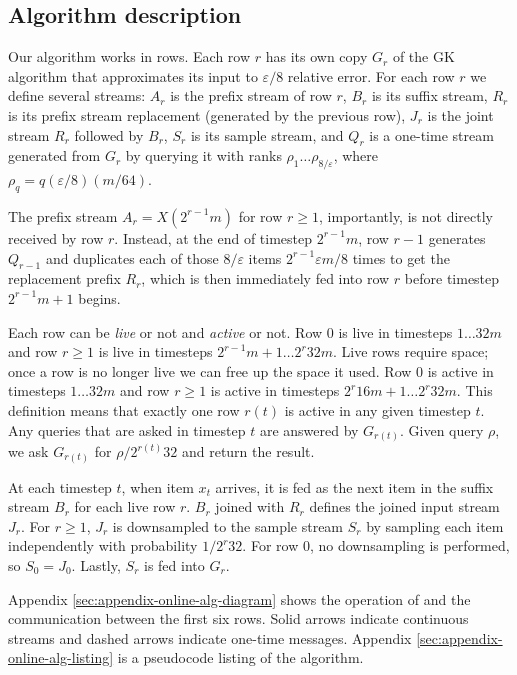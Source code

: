 \documentclass{article}
\theoremstyle{plain}
\def\ep{\varepsilon}
\def\m{\!-\!}
\def\pl{\!+\!}
\newcommand{\p}[1]{(#1)}
\begin{document}
\subsection{Algorithm description}
\label{sec:online-alg}

Our algorithm works in rows. Each row $r$ has its own copy $G_r$ of the GK
algorithm that approximates its input to $\ep/8$ relative error. For each row
$r$ we define several streams: $A_r$ is the prefix stream of row $r$, $B_r$ is
its suffix stream, $R_r$ is its prefix stream replacement (generated by the
previous row), $J_r$ is the joint stream $R_r$ followed by $B_r$, $S_r$ is its
sample stream, and $Q_r$ is a one-time stream generated from $G_r$ by querying
it with ranks
$\rho_1 \ldots \rho_{8/\ep}$,
where $\rho_q = q \p{\ep/8} \p{m/64}$.

The prefix stream $A_r = X\p{2^{r-1} m}$ for row $r \ge 1$, importantly, is not
directly received by row $r$. Instead, at the end of timestep $2^{r-1} m$, row
$r \m 1$ generates $Q_{r-1}$ and duplicates each of those $8 / \ep$ items
$2^{r-1} \ep m / 8$ times to get the replacement prefix $R_r$, which is then
immediately fed into row $r$ before timestep $2^{r-1} m \pl 1$ begins.

Each row can be \emph{live} or not and \emph{active} or not. Row $0$ is live in
timesteps $1 \ldots 32 m$ and row $r \ge 1$ is live in timesteps $2^{r-1} m \pl
1 \ldots 2^r 32 m$. Live rows require space; once a row is no longer live we can
free up the space it used. Row $0$ is active in timesteps $1 \ldots 32 m$ and
row $r \ge 1$ is active in timesteps $2^r 16 m \pl 1 \ldots 2^r 32 m$. This
definition means that exactly one row $r\p{t}$ is active in any given timestep
$t$. Any queries that are asked in timestep $t$ are answered by $G_{r\p{t}}$.
Given query $\rho$, we ask $G_{r\p{t}}$ for $\rho/2^{r\p{t}} 32$ and return the
result.

At each timestep $t$, when item $x_t$ arrives, it is fed as the next item in the
suffix stream $B_r$ for each live row $r$. $B_r$ joined with $R_r$ defines the
joined input stream $J_r$. For $r \ge 1$, $J_r$ is downsampled to the sample
stream $S_r$ by sampling each item independently with probability $1/2^r 32$.
For row $0$, no downsampling is performed, so $S_0 = J_0$. Lastly, $S_r$ is fed
into $G_r$.

Appendix \ref{sec:appendix-online-alg-diagram} shows the operation of and the
communication between the first six rows. Solid arrows indicate continuous
streams and dashed arrows indicate one-time messages. Appendix
\ref{sec:appendix-online-alg-listing} is a pseudocode listing of the algorithm.
\end{document}
